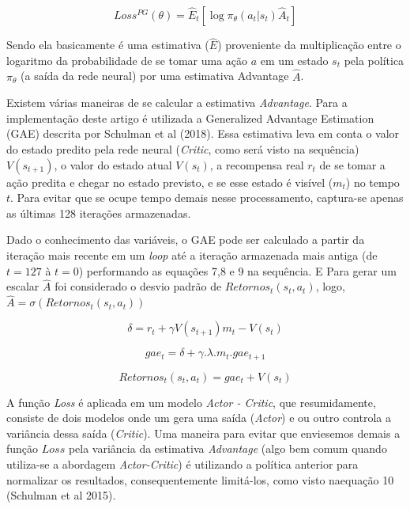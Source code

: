 \documentclass[letterpaper]{article} %
\begin{document}
\begin{equation}
Loss^{PG}(\theta) =  \hat{E}_t[\log \pi_{\theta}(a_t | s_t) \hat{A}_t]
\end{equation}

Sendo ela basicamente é uma estimativa ($\hat{E}$) proveniente da multiplicação entre o logaritmo da probabilidade de se tomar uma ação $a$ em um estado $s_t$ pela política $\pi_{\theta}$ (a saída da rede neural) por uma estimativa Advantage $\hat{A}$. 

Existem várias maneiras de se calcular a estimativa \textit{Advantage}. Para a implementação deste artigo é utilizada a Generalized Advantage Estimation (GAE) descrita por Schulman et al (2018). Essa estimativa leva em conta o valor do estado predito pela rede neural (\textit{Critic}, como será visto na sequência) $V(s_{t+1})$, o valor do estado atual  $V(s_t)$, a recompensa real $r_t$ de se tomar a ação predita e chegar no estado previsto, e se esse estado é visível ($m_t$) no tempo $t$. Para evitar que se ocupe tempo demais nesse processamento, captura-se apenas as últimas 128 iterações armazenadas.

Dado o conhecimento das variáveis, o GAE pode ser calculado a partir da iteração mais recente em um \textit{loop} até a iteração armazenada mais antiga (de $t=127$ à $t=0$) performando as equações 7,8 e 9 na sequência. E Para gerar um escalar $\hat{A}$ foi considerado o desvio padrão de $Retornos_t(s_t, a_t)$, logo, $\hat{A} = \sigma(Retornos_t(s_t, a_t))$


\begin{equation}
\delta = r_t + \gamma V(s_{t+1}) m_t - V(s_t)
\end{equation}

\begin{equation}
gae_t = \delta + \gamma . \lambda . m_t . gae_{t+1}
\end{equation}

\begin{equation}
Retornos_t(s_t, a_t) = gae_t + V(s_t)
\end{equation}


A função \textit{Loss} é aplicada em um modelo \textit{Actor - Critic}, que resumidamente, consiste de dois modelos onde um gera uma saída (\textit{Actor}) e ou outro controla a variância dessa saída (\textit{Critic}). Uma maneira para evitar que enviesemos demais a função $Loss$ pela variância da estimativa \textit{Advantage} (algo bem comum quando utiliza-se a abordagem \textit{Actor-Critic}) é utilizando a política anterior para normalizar os resultados, consequentemente limitá-los, como visto naequação 10 (Schulman et al 2015).
\end{document}
